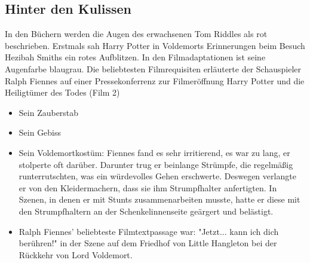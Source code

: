 \documentclass[a4paper, 10pt]{article}
\begin{document}
\subsection*{\Large Hinter den Kulissen}
In den Büchern werden die Augen des erwachsenen Tom Riddles als rot beschrieben. Erstmals sah Harry Potter in Voldemorts Erinnerungen beim Besuch Hezibah Smiths ein rotes Aufblitzen. In den Filmadaptationen ist seine Augenfarbe blaugrau.
\vspace{10pt}
\newline
{}  
Die beliebtesten Filmrequisiten erläuterte der Schauspieler Ralph Fiennes auf einer Pressekonferrenz zur Filmeröffnung Harry Potter und die Heiligtümer des Todes (Film 2)
\begin{itemize}
    \item Sein Zauberstab
    \item Sein Gebiss
    \item Sein Voldemortkostüm: Fiennes fand es sehr irritierend, es war zu lang, er stolperte oft darüber. Darunter trug er beinlange Strümpfe, die regelmäßig runterrutschten, was ein würdevolles Gehen erschwerte. Deswegen verlangte er von den Kleidermachern, dass sie ihm Strumpfhalter anfertigten. In Szenen, in denen er mit Stunts zusammenarbeiten musste, hatte er diese mit den Strumpfhaltern an der Schenkelinnenseite geärgert und belästigt.
    \item Ralph Fiennes' beliebteste Filmtextpassage war: "Jetzt... kann ich dich berühren!" in der Szene auf dem Friedhof von Little Hangleton bei der Rückkehr von Lord Voldemort.
\end{itemize}
\end{document}
